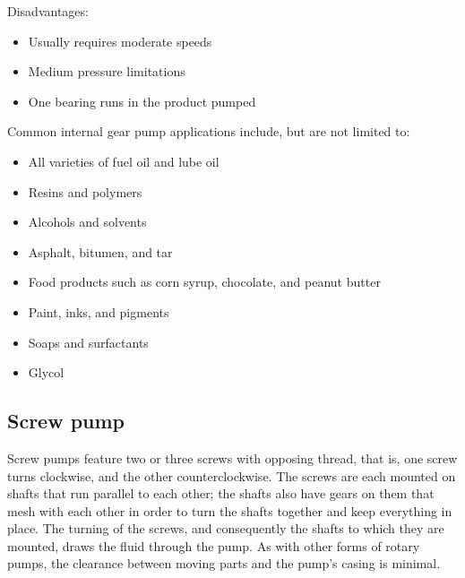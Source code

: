 \noindent Disadvantages:
\begin{itemize}
\item Usually requires moderate speeds
\item Medium pressure limitations
\item One bearing runs in the product pumped
\end{itemize} 

\noindent Common internal gear pump applications include, but are not limited to:
\begin{itemize}
\item All varieties of fuel oil and lube oil
\item Resins and polymers
\item Alcohols and solvents
\item Asphalt, bitumen, and tar
\item Food products such as corn syrup, chocolate, and peanut butter
\item Paint, inks, and pigments
\item Soaps and surfactants
\item Glycol
\end{itemize}


\subsection{Screw pump}
Screw pumps feature two or three screws with opposing thread, that is, one screw turns clockwise, and the other counterclockwise. The screws are each mounted on shafts that run parallel to each other; the shafts also have gears on them that mesh with each other in order to turn the shafts together and keep everything in place. The turning of the screws, and consequently the shafts to which they are mounted, draws the fluid through the pump. As with other forms of rotary pumps, the clearance between moving parts and the pump's casing is minimal.


